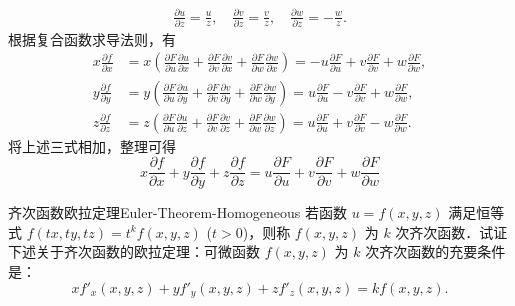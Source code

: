\begin{myproof}
\begin{equation}
\begin{aligned}
            \frac{\partial u}{\partial z} = \frac{u}{z}, \quad \frac{\partial v}{\partial z} = \frac{v}{z}, \quad \frac{\partial w}{\partial z} = -\frac{w}{z}.
        \end{aligned}
    \end{equation}
    根据复合函数求导法则，有
    \begin{equation}
        \begin{aligned}
            x \frac{\partial f}{\partial x} & = x \left( \frac{\partial F}{\partial u} \frac{\partial u}{\partial x} + \frac{\partial F}{\partial v} \frac{\partial v}{\partial x} + \frac{\partial F}{\partial w} \frac{\partial w}{\partial x} \right) = -u \frac{\partial F}{\partial u} + v \frac{\partial F}{\partial v} + w \frac{\partial F}{\partial w}, \\
            y \frac{\partial f}{\partial y} & = y \left( \frac{\partial F}{\partial u} \frac{\partial u}{\partial y} + \frac{\partial F}{\partial v} \frac{\partial v}{\partial y} + \frac{\partial F}{\partial w} \frac{\partial w}{\partial y} \right) = u \frac{\partial F}{\partial u} - v \frac{\partial F}{\partial v} + w \frac{\partial F}{\partial w},  \\
            z \frac{\partial f}{\partial z} & = z \left( \frac{\partial F}{\partial u} \frac{\partial u}{\partial z} + \frac{\partial F}{\partial v} \frac{\partial v}{\partial z} + \frac{\partial F}{\partial w} \frac{\partial w}{\partial z} \right) = u \frac{\partial F}{\partial u} + v \frac{\partial F}{\partial v} - w \frac{\partial F}{\partial w}.
        \end{aligned}
    \end{equation}
    将上述三式相加，整理可得
    \begin{equation}
        \boxed{x \frac{\partial f}{\partial x} + y \frac{\partial f}{\partial y} + z \frac{\partial f}{\partial z} = u \frac{\partial F}{\partial u} + v \frac{\partial F}{\partial v} + w \frac{\partial F}{\partial w}}
    \end{equation}
\end{myproof}


\begin{problem}{齐次函数欧拉定理}{Euler-Theorem-Homogeneous}
    若函数 $u = f(x, y, z)$ 满足恒等式 $f(tx, ty, tz) = t^k f(x, y, z)$ ($t > 0$)，则称 $f(x, y, z)$ 为 $k$ 次齐次函数．试证下述关于齐次函数的欧拉定理：可微函数 $f(x, y, z)$ 为 $k$ 次齐次函数的充要条件是：
    \begin{equation}
        x f'_x(x, y, z) + y f'_y(x, y, z) + z f'_z(x, y, z) = k f(x, y, z).
    \end{equation}
\end{problem}


